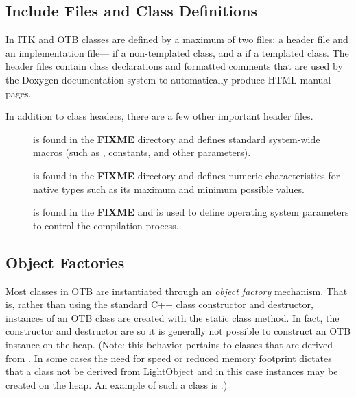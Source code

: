 \subsection{Include Files and Class Definitions}
\label{sec:IncludeFiles}

In ITK and OTB classes are defined by a maximum of two files: a header  file
and an implementation file--- if a non-templated class, and a
 if a templated class.
The header files contain class declarations
and formatted comments that are used by the Doxygen documentation
system to automatically produce HTML manual pages.

In addition to class headers, there are a few other important header files.
\begin{description}
        \item[] is found in the \textbf{FIXME} directory
        and defines standard system-wide macros (such as ,
        constants, and other parameters).

        \item[] is found in the  \textbf{FIXME}
        directory and defines numeric characteristics for native types such
        as its maximum and minimum possible values.

        \item[] is found in the  \textbf{FIXME}
        and is used to define operating system parameters to control
        the compilation process.
\end{description}

\subsection{Object Factories}
\label{sec:ObjectFactories}


Most classes in OTB are instantiated through an \emph{object factory}
mechanism. That is, rather than using the standard C++ class constructor and
destructor, instances of an OTB class are created with the static class
 method. In fact, the constructor and destructor are
 so it is generally not possible to construct an OTB
instance on the heap. (Note: this behavior pertains to classes that are
derived from . In some cases the need for speed or
reduced memory footprint dictates that a class not be derived from
LightObject and in this case instances may be created on the heap. An
example of such a class is .)

